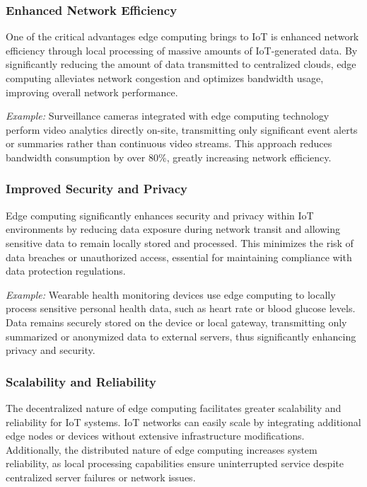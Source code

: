 \documentclass[runningheads]{llncs}
\begin{document}
\subsubsection{Enhanced Network Efficiency}
One of the critical advantages edge computing brings to IoT is enhanced network efficiency through local processing of massive amounts of IoT-generated data. By significantly reducing the amount of data transmitted to centralized clouds, edge computing alleviates network congestion and optimizes bandwidth usage, improving overall network performance.

\textit{Example:} Surveillance cameras integrated with edge computing technology perform video analytics directly on-site, transmitting only significant event alerts or summaries rather than continuous video streams. This approach reduces bandwidth consumption by over 80\%, greatly increasing network efficiency.

\subsubsection{Improved Security and Privacy}
Edge computing significantly enhances security and privacy within IoT environments by reducing data exposure during network transit and allowing sensitive data to remain locally stored and processed. This minimizes the risk of data breaches or unauthorized access, essential for maintaining compliance with data protection regulations.

\textit{Example:} Wearable health monitoring devices use edge computing to locally process sensitive personal health data, such as heart rate or blood glucose levels. Data remains securely stored on the device or local gateway, transmitting only summarized or anonymized data to external servers, thus significantly enhancing privacy and security.

\subsubsection{Scalability and Reliability}
The decentralized nature of edge computing facilitates greater scalability and reliability for IoT systems. IoT networks can easily scale by integrating additional edge nodes or devices without extensive infrastructure modifications. Additionally, the distributed nature of edge computing increases system reliability, as local processing capabilities ensure uninterrupted service despite centralized server failures or network issues.
\end{document}
